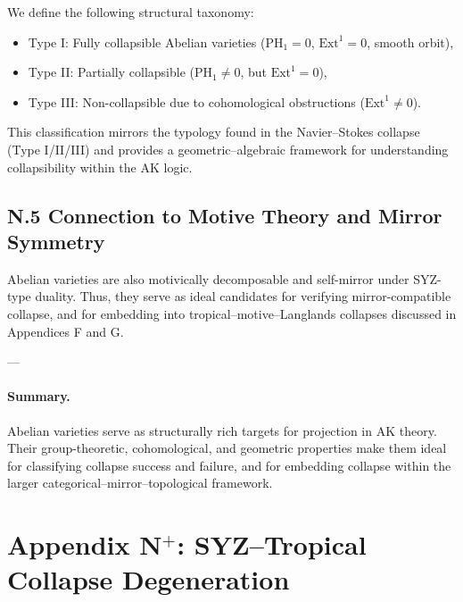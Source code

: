 \documentclass[11pt]{article}
\begin{document}
\begin{axiom}
\begin{axiom}
{{We define the following structural taxonomy:

\begin{itemize}
  \item Type I: Fully collapsible Abelian varieties (\( \mathrm{PH}_1 = 0 \), \( \mathrm{Ext}^1 = 0 \), smooth orbit),
  \item Type II: Partially collapsible (\( \mathrm{PH}_1 \neq 0 \), but \( \mathrm{Ext}^1 = 0 \)),
  \item Type III: Non-collapsible due to cohomological obstructions (\( \mathrm{Ext}^1 \neq 0 \)).
\end{itemize}

This classification mirrors the typology found in the Navier–Stokes collapse (Type I/II/III) and provides a geometric–algebraic framework for understanding collapsibility within the AK logic.

\subsection*{N.5 Connection to Motive Theory and Mirror Symmetry}

Abelian varieties are also motivically decomposable and self-mirror under SYZ-type duality.  
Thus, they serve as ideal candidates for verifying mirror-compatible collapse, and for embedding into tropical–motive–Langlands collapses discussed in Appendices F and G.

---

\paragraph{Summary.}

Abelian varieties serve as structurally rich targets for projection in AK theory.  
Their group-theoretic, cohomological, and geometric properties make them ideal for classifying collapse success and failure, and for embedding collapse within the larger categorical–mirror–topological framework.



\section*{Appendix N$^+$: SYZ–Tropical Collapse Degeneration}

}}
\end{axiom}
\end{axiom}
\end{document}
